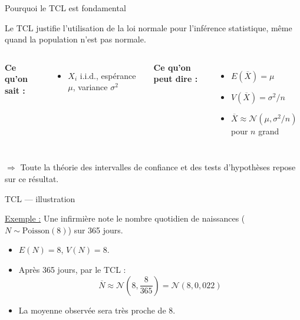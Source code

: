 \documentclass{BeamerTemplate}
\begin{document}
\begin{frame}[t]{Pourquoi le TCL est fondamental}

Le TCL justifie l'utilisation de la loi normale pour l'inférence statistique, même quand la population n'est pas normale.

\bigskip
\begin{columns}[t]
\textbf{Ce qu'on sait :}
\begin{itemize}\itemsep3mm
  \item $X_i$ i.i.d., espérance $\mu$, variance $\sigma^2$
\end{itemize}

\textbf{Ce qu'on peut dire :}
\begin{itemize}\itemsep3mm
  \item $E(\overline{X}) = \mu$
  \item $V(\overline{X}) = \sigma^2/n$
  \item $\overline{X} \approx \mathcal{N}(\mu, \sigma^2/n)$ pour $n$ grand
\end{itemize}
\end{columns}

\bigskip
$\Rightarrow$ Toute la théorie des intervalles de confiance et des tests d'hypothèses repose sur ce résultat.

\end{frame}

\begin{frame}[t]{TCL — illustration}

\underline{Exemple :} Une infirmière note le nombre quotidien de naissances ($N \sim \text{Poisson}(8)$) sur 365 jours.

\bigskip
\begin{itemize}\itemsep5mm
  \item $E(N) = 8$, $V(N) = 8$.
  \item Après 365 jours, par le TCL :
  $$\overline{N} \approx \mathcal{N}\!\left(8, \frac{8}{365}\right) = \mathcal{N}(8, 0{,}022)$$
  \item La moyenne observée sera très proche de 8.
\end{itemize}

\end{frame}
\end{document}
